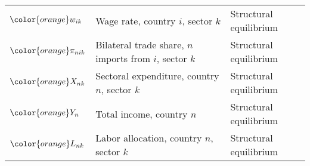 \begin{table}[H]
{\begin{tabular}{>{\raggedright}p{2cm} >{\raggedright}p{8cm} >{\raggedright\arraybackslash}p{5cm}}
${\color{orange}w_{ik}}$ & Wage rate, country $i$, sector $k$ & Structural equilibrium \\
${\color{orange}\pi_{nik}}$ & Bilateral trade share, $n$ imports from $i$, sector $k$ & Structural equilibrium \\
${\color{orange}X_{nk}}$ & Sectoral expenditure, country $n$, sector $k$ & Structural equilibrium \\
${\color{orange}Y_{n}}$ & Total income, country $n$ & Structural equilibrium \\
${\color{orange}L_{nk}}$ & Labor allocation, country $n$, sector $k$ & Structural equilibrium \\
\bottomrule
\end{tabular}%
}
\end{table}
